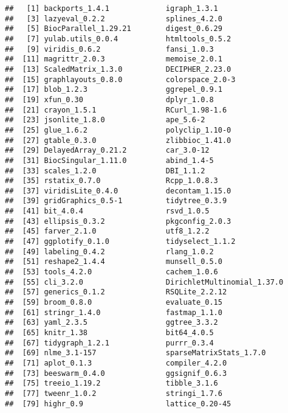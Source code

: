 \documentclass[
  oneside]{book}
\begin{document}
\begin{verbatim}
##   [1] backports_1.4.1             igraph_1.3.1               
##   [3] lazyeval_0.2.2              splines_4.2.0              
##   [5] BiocParallel_1.29.21        digest_0.6.29              
##   [7] yulab.utils_0.0.4           htmltools_0.5.2            
##   [9] viridis_0.6.2               fansi_1.0.3                
##  [11] magrittr_2.0.3              memoise_2.0.1              
##  [13] ScaledMatrix_1.3.0          DECIPHER_2.23.0            
##  [15] graphlayouts_0.8.0          colorspace_2.0-3           
##  [17] blob_1.2.3                  ggrepel_0.9.1              
##  [19] xfun_0.30                   dplyr_1.0.8                
##  [21] crayon_1.5.1                RCurl_1.98-1.6             
##  [23] jsonlite_1.8.0              ape_5.6-2                  
##  [25] glue_1.6.2                  polyclip_1.10-0            
##  [27] gtable_0.3.0                zlibbioc_1.41.0            
##  [29] DelayedArray_0.21.2         car_3.0-12                 
##  [31] BiocSingular_1.11.0         abind_1.4-5                
##  [33] scales_1.2.0                DBI_1.1.2                  
##  [35] rstatix_0.7.0               Rcpp_1.0.8.3               
##  [37] viridisLite_0.4.0           decontam_1.15.0            
##  [39] gridGraphics_0.5-1          tidytree_0.3.9             
##  [41] bit_4.0.4                   rsvd_1.0.5                 
##  [43] ellipsis_0.3.2              pkgconfig_2.0.3            
##  [45] farver_2.1.0                utf8_1.2.2                 
##  [47] ggplotify_0.1.0             tidyselect_1.1.2           
##  [49] labeling_0.4.2              rlang_1.0.2                
##  [51] reshape2_1.4.4              munsell_0.5.0              
##  [53] tools_4.2.0                 cachem_1.0.6               
##  [55] cli_3.2.0                   DirichletMultinomial_1.37.0
##  [57] generics_0.1.2              RSQLite_2.2.12             
##  [59] broom_0.8.0                 evaluate_0.15              
##  [61] stringr_1.4.0               fastmap_1.1.0              
##  [63] yaml_2.3.5                  ggtree_3.3.2               
##  [65] knitr_1.38                  bit64_4.0.5                
##  [67] tidygraph_1.2.1             purrr_0.3.4                
##  [69] nlme_3.1-157                sparseMatrixStats_1.7.0    
##  [71] aplot_0.1.3                 compiler_4.2.0             
##  [73] beeswarm_0.4.0              ggsignif_0.6.3             
##  [75] treeio_1.19.2               tibble_3.1.6               
##  [77] tweenr_1.0.2                stringi_1.7.6              
##  [79] highr_0.9                   lattice_0.20-45            

\end{verbatim}
\end{document}

